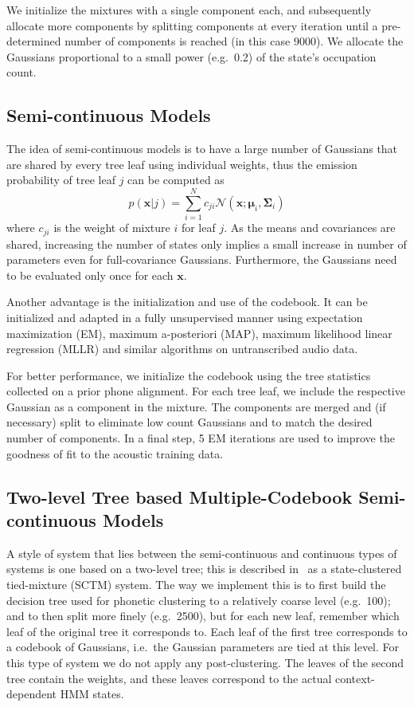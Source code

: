 \documentclass{article}
\def \x{{\mathbf x}}
\def \m{{\bm \mu}}
\def \k{{\mathbf \Sigma}}
\def \nv{{\mathcal N}}
\begin{document}
We initialize the mixtures with a single component each, and subsequently 
allocate more components by splitting components at every iteration until a 
pre-determined number of components is reached (in this case 9000). We allocate 
the Gaussians proportional to a small power (e.g.~0.2) of the state's 
occupation count.

\subsection{Semi-continuous Models}
The idea of semi-continuous models is to have a large number of Gaussians that
are shared by every tree leaf using individual weights, thus the emission 
probability of tree leaf $j$ can be computed as
\begin{equation}
p(\x | j) = \sum_{i=1}^{N} c_{ji} \nv(\x; \m_i, \k_i) 
\end{equation}
where $c_{ji}$ is the weight of mixture $i$ for leaf $j$. As the means
and covariances are shared, increasing the number of states only implies
a small increase in number of parameters even for full-covariance Gaussians.
Furthermore, the Gaussians need to be evaluated only once for each $\x$.

Another advantage is the initialization and use of the codebook. It can be
initialized and adapted in a fully unsupervised manner using expectation
maximization (EM), maximum a-posteriori (MAP), maximum likelihood linear
regression (MLLR) and similar algorithms on untranscribed audio data.

For better performance, we initialize the codebook using the tree statistics
collected on a prior phone alignment. For each tree leaf, we include
the respective Gaussian as a component in the mixture.
The components are merged and (if necessary) split to eliminate low count 
Gaussians and to match the desired number of components. In a final step, 
5 EM iterations are used to improve the goodness of fit to the acoustic 
training data.

\subsection{Two-level Tree based Multiple-Codebook Semi-continuous Models}
A style of system that lies between the semi-continuous and continuous types of
systems is one based on a two-level tree; this is described in~\cite{prasad2004t2b}
as a state-clustered tied-mixture (SCTM) system. The way we implement this is
to first build the decision tree used for phonetic clustering to a relatively
coarse level (e.g.~100); and to then split more finely (e.g.~2500), but for
each new leaf, remember which leaf of the original tree it corresponds to.
Each leaf of the first tree corresponds to a codebook of Gaussians, i.e.~the 
Gaussian parameters are tied at this level.  For this type of system we do not
apply any post-clustering.
The leaves of the second tree contain the weights, and these leaves correspond 
to the actual context-dependent HMM states.  
\end{document}
